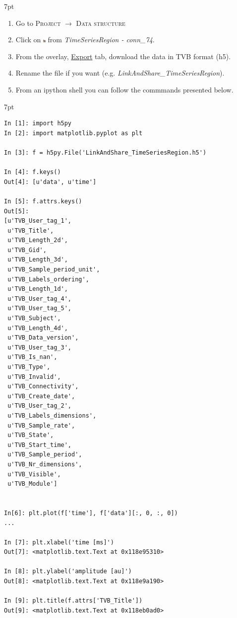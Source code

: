 \documentclass{tufte-handout}
\newenvironment{formal}{%
  \def\FrameCommand{%
    \hspace{1pt}%
    {\color{DarkBlue}\vrule width 2pt}%
    {\color{formalshade}\vrule width 4pt}%
    \colorbox{formalshade}%
  }%
  \MakeFramed{\advance\hsize-\width\FrameRestore}%
  \noindent\hspace{-4.55pt}%
  \begin{adjustwidth}{}{7pt}%
  \vspace{2pt}\vspace{2pt}%
}
{%
  \vspace{2pt}\end{adjustwidth}\endMakeFramed%
}
\newenvironment{blah}{%
  \def\FrameCommand{%
    \hspace{1pt}%
    {\color{DarkOrange}\vrule width 2pt}%
    {\color{PeachPuff}\vrule width 4pt}%
    \colorbox{PeachPuff}%
  }%
  \MakeFramed{\advance\hsize-\width\FrameRestore}%
  \noindent\hspace{-4.55pt}%
  \begin{adjustwidth}{}{7pt}%
  \vspace{2pt}\vspace{2pt}%
}
{%
  \vspace{2pt}\end{adjustwidth}\endMakeFramed%
}
\begin{document}
\begin{formal}
  \begin{enumerate}
    \item Go to \textsc{Project} $\rightarrow$ \textsc{Data structure}
    \item Click on \includegraphics[width=0.01\textwidth]{nodeTimeSeriesRegion.png} from \textit{TimeSeriesRegion - conn\_74}. 
    \item From the overlay, \underline{Export} tab, download the data in TVB format (h5).
    \item Rename the file if you want (e.g. \textit{LinkAndShare\_TimeSeriesRegion}).
    \item From an ipython shell you can follow the commmands presented below. 
  \end{enumerate}
\end{formal} 

\begin{blah}
\begin{verbatim}
In [1]: import h5py
In [2]: import matplotlib.pyplot as plt

In [3]: f = h5py.File('LinkAndShare_TimeSeriesRegion.h5')

In [4]: f.keys()
Out[4]: [u'data', u'time']

In [5]: f.attrs.keys()
Out[5]: 
[u'TVB_User_tag_1',
 u'TVB_Title',
 u'TVB_Length_2d',
 u'TVB_Gid',
 u'TVB_Length_3d',
 u'TVB_Sample_period_unit',
 u'TVB_Labels_ordering',
 u'TVB_Length_1d',
 u'TVB_User_tag_4',
 u'TVB_User_tag_5',
 u'TVB_Subject',
 u'TVB_Length_4d',
 u'TVB_Data_version',
 u'TVB_User_tag_3',
 u'TVB_Is_nan',
 u'TVB_Type',
 u'TVB_Invalid',
 u'TVB_Connectivity',
 u'TVB_Create_date',
 u'TVB_User_tag_2',
 u'TVB_Labels_dimensions',
 u'TVB_Sample_rate',
 u'TVB_State',
 u'TVB_Start_time',
 u'TVB_Sample_period',
 u'TVB_Nr_dimensions',
 u'TVB_Visible',
 u'TVB_Module']


In[6]: plt.plot(f['time'], f['data'][:, 0, :, 0])
...

In [7]: plt.xlabel('time [ms]')
Out[7]: <matplotlib.text.Text at 0x118e95310>

In [8]: plt.ylabel('amplitude [au]')
Out[8]: <matplotlib.text.Text at 0x118e9a190>

In [9]: plt.title(f.attrs['TVB_Title'])
Out[9]: <matplotlib.text.Text at 0x118eb0ad0>
\end{verbatim}
\end{blah}
\end{document}

